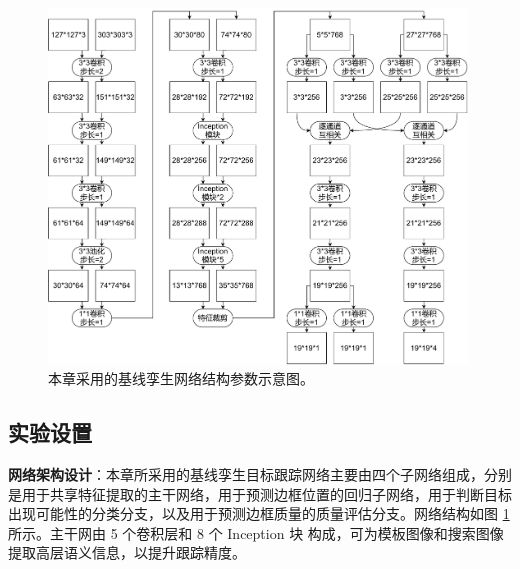 \begin{figure}[t!]
    \centering
    \includegraphics[width=0.99\textwidth]{Img/MTP/SiamFC++.pdf}
    \caption{本章采用的基线孪生网络结构参数示意图。}
    \label{fig:MTP_SiamFC++}
\end{figure}

\subsection{实验设置}
\textbf{网络架构设计}：本章所采用的基线孪生目标跟踪网络主要由四个子网络组成，分别是用于共享特征提取的主干网络，用于预测边框位置的回归子网络，用于判断目标出现可能性的分类分支，以及用于预测边框质量的质量评估分支。网络结构如图 \ref{fig:MTP_SiamFC++} 所示。主干网由 5 个卷积层和 8 个 Inception 块 \cite{GoogLeNet} 构成，可为模板图像和搜索图像提取高层语义信息，以提升跟踪精度。

